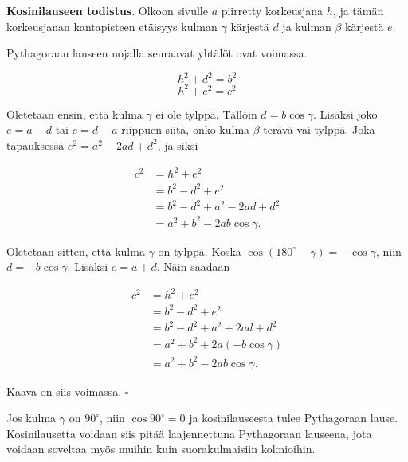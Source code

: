 \textbf{Kosinilauseen todistus}. Olkoon sivulle $a$ piirretty korkeusjana $h$, ja tämän
korkeusjanan kantapisteen etäisyys kulman $\gamma$ kärjestä $d$ ja kulman $\beta$ kärjestä $e$.



Pythagoraan lauseen nojalla seuraavat yhtälöt ovat voimassa.

\[
h^2 + d^2 = b^2
\]
\[
h^2 + e^2 = c^2
\]

Oletetaan ensin, että kulma $\gamma$ ei ole tylppä. Tällöin $d = b \cos \gamma$.
Lisäksi joko $e = a - d$ tai $e = d - a$ riippuen siitä, onko kulma $\beta$ terävä vai
tylppä. Joka tapauksessa $e^2 = a^2 - 2ad + d^2$, ja siksi

\begin{align*}
c^2 &= h^2 + e^2 \\
&= b^2 - d^2 + e^2 \\
&= b^2 - d^2 + a^2 - 2 a d + d^2 \\
&= a^2 + b^2 - 2 a b \cos \gamma .
\end{align*}

Oletetaan sitten, että kulma $\gamma$ on tylppä. Koska $\cos (180^{\circ} - \gamma )
= - \cos \gamma$, niin $d = -b \cos \gamma$. Lisäksi $e = a + d$. Näin saadaan

\begin{align*}
c^2 &= h^2 + e^2 \\
&= b^2 - d^2 + e^2 \\
&= b^2 - d^2 + a^2 + 2 a d + d^2 \\
&= a^2 + b^2 + 2 a(- b \cos \gamma ) \\
&= a^2 + b^2 - 2 a b \cos \gamma .
\end{align*}

Kaava on siis voimassa. $\square$

Jos kulma $\gamma$ on $90^\circ$, niin $\cos 90^\circ=0$ ja kosinilauseesta tulee Pythagoraan lause. Kosinilausetta voidaan siis pitää laajennettuna Pythagoraan lauseena, jota voidaan soveltaa myös muihin kuin suorakulmaisiin kolmioihin.
